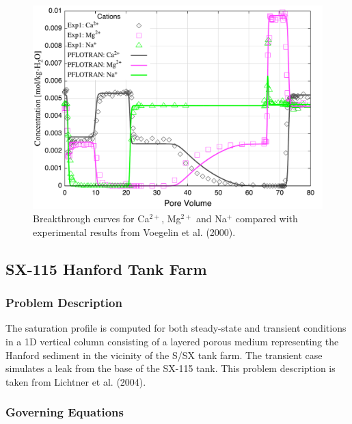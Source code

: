 \documentclass[12pt]{article}
\begin{document}
\begin{figure}[h]\centering
\includegraphics[scale=0.5]{./figs/ionex}
\caption{Breakthrough curves for Ca$^{2+}$, Mg$^{2+}$ and Na$^+$ compared with experimental results from Voegelin et al. (2000).}\label{fionex}
\end{figure}

\newpage
\footnotesize
\label{tionex}
\normalsize

\newpage

\subsection{SX-115 Hanford Tank Farm}

\subsubsection{Problem Description}

The saturation profile is computed for both steady-state and transient conditions in a 1D vertical column consisting of a layered porous medium representing the Hanford sediment in the vicinity of the S/SX tank farm. The transient case simulates a leak from the base of the SX-115 tank. This problem description is taken from Lichtner et al. (2004).

\subsubsection{Governing Equations}
\end{document}
